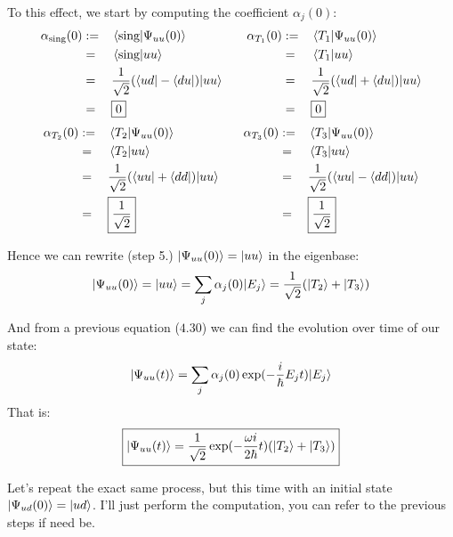 \documentclass[solutions.tex]{subfiles}
\begin{document}
To this effect, we start by computing the coefficient $\alpha_j(0)$:
\begin{equation*}\begin{aligned}
	\alpha_{\text{sing}}(0) &:=&& \left\langle \text{sing} \middle| \Psi_{uu}(0) \right\rangle &&&
	\alpha_{T_1}(0) &:=&& \left\langle T_1 \middle| \Psi_{uu}(0) \right\rangle \\
	~ &=&& \left\langle \text{sing} \middle| uu \right\rangle &&&
	~ &=&& \left\langle T_1 \middle| uu \right\rangle \\
	~ &=&& \frac1{\sqrt2}(\langle ud|-\langle du|)|uu\rangle &&&
	~ &=&& \frac1{\sqrt2}(\langle ud|+\langle du|)|uu\rangle \\
	~ &=&& \boxed{0} &&&
	~ &=&& \boxed{0} \\
\end{aligned}\end{equation*}
\begin{equation*}\begin{aligned}
	\alpha_{T_2}(0) &:=&& \left\langle T_2 \middle| \Psi_{uu}(0) \right\rangle &&&
	\alpha_{T_3}(0) &:=&& \left\langle T_3 \middle| \Psi_{uu}(0) \right\rangle \\
	~ &=&& \left\langle T_2 \middle| uu \right\rangle &&&
	~ &=&& \left\langle T_3 \middle| uu \right\rangle \\
	~ &=&& \frac1{\sqrt2}(\langle uu|+\langle dd|)|uu\rangle &&&
	~ &=&& \frac1{\sqrt2}(\langle uu|-\langle dd|)|uu\rangle \\
	~ &=&& \boxed{\frac1{\sqrt2}} &&&
	~ &=&& \boxed{\frac1{\sqrt2}} \\
\end{aligned}\end{equation*}

Hence we can rewrite (step 5.) $|\Psi_{uu}(0)\rangle=|uu\rangle$ in the eigenbase:
\[
	|\Psi_{uu}(0)\rangle = |uu\rangle = \sum_j\alpha_j(0)|E_j\rangle
		= \frac1{\sqrt2}(|T_2\rangle+|T_3\rangle)
\]

And from a previous equation ($4.30$) we can find the evolution over
time of our state:
\[
	|\Psi_{uu}(t)\rangle = \sum_j\alpha_j(0)\exp(-\frac{i}\hbar E_jt)|E_j\rangle
\]
That is:
\[
	\boxed{
		|\Psi_{uu}(t)\rangle = \frac1{\sqrt2}\exp(-\frac{\omega i}{2\hbar} t)(|T_2\rangle+|T_3\rangle)
	}
\]

\hr

Let's repeat the exact same process, but this time with an initial
state $|\Psi_{ud}(0)\rangle = |ud\rangle$. I'll just perform the computation,
you can refer to the previous steps if need be.
\end{document}
